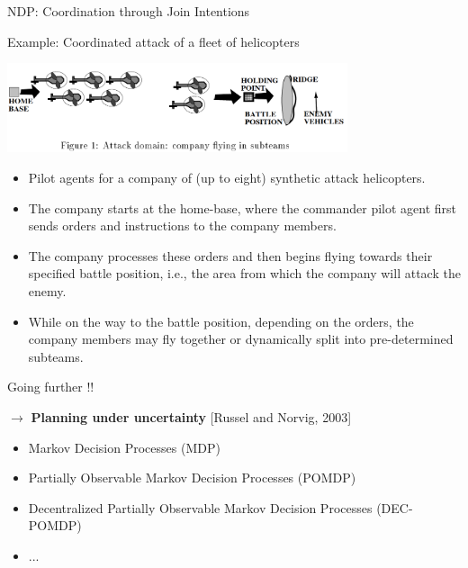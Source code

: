 \documentclass[9pt]{beamer}
\begin{document}
\begin{frame}{NDP: Coordination through Join Intentions}
\begin{small}

\begin{exampleblock}{Example: Coordinated attack of a fleet of helicopters}
\begin{center}
\includegraphics[keepaspectratio,width=0.75\textwidth]{images/STEAM.png}
\end{center}

\begin{itemize}
\item Pilot agents for a company of (up to eight) synthetic attack helicopters.
\item The company starts at the home-base, where the commander pilot agent first sends orders and instructions to the company members.
\item The company processes these orders and then begins flying towards their specified battle position, i.e., the area from which the company will attack the enemy.
\item While on the way to the battle position, depending on the orders, the company members may fly together or dynamically split into pre-determined subteams.
\end{itemize}
\end{exampleblock}

\end{small}
\end{frame}

\begin{frame}{Going further !!}
\begin{small}

$\rightarrow$ \textbf{Planning under uncertainty} [Russel and Norvig, 2003]

\begin{itemize}
\item Markov Decision Processes (MDP)
\item Partially Observable Markov Decision Processes (POMDP)
\item Decentralized Partially Observable Markov Decision Processes (DEC-POMDP)
\item ...
\end{itemize}
\end{small}
\end{frame}
\end{document}

